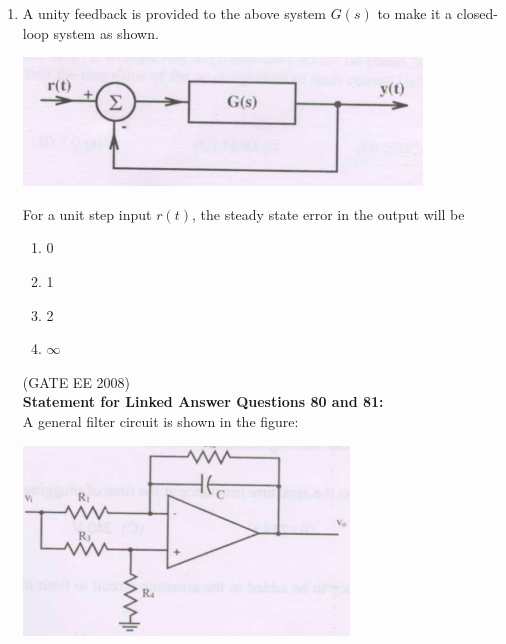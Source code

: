\documentclass[journal,12pt,onecolumn]{IEEEtran}
\theoremstyle{remark}
\begin{document}
\begin{enumerate}[start=1, label=Q.\arabic*]
\item A unity feedback is provided to the above system $G(s)$ to make it a closed-loop system as shown.
\begin{center}
    \includegraphics[width=\columnwidth]{Fig/q79.png}
\end{center}

  For a unit step input $r(t)$, the steady state error in the output will be
\begin{multicols}{4}
\begin{enumerate}[label=(\Alph*)]
    \item 0
    \item 1
    \item 2
    \item $\infty$
\end{enumerate}
\end{multicols}
\hfill (GATE EE 2008) \\[5mm]


\textbf{Statement for Linked Answer Questions 80 and 81:}\\

A general filter circuit is shown in the figure:

\begin{center}
    \includegraphics[width=\columnwidth]{Fig/comp4.png}
\end{center}


\end{enumerate}
\end{document}

